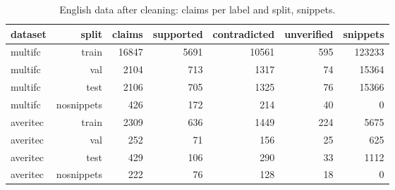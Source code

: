 \begin{table}[t]
\centering
\caption{English data after cleaning: claims per label and split, snippets.}
\label{tab:tab_data_counts}
\begin{tabular}{lrrrrrr}
\toprule
dataset & split & claims & supported & contradicted & unverified & snippets \\
\midrule
multifc & train & 16847 & 5691 & 10561 & 595 & 123233 \\
multifc & val & 2104 & 713 & 1317 & 74 & 15364 \\
multifc & test & 2106 & 705 & 1325 & 76 & 15366 \\
multifc & nosnippets & 426 & 172 & 214 & 40 & 0 \\
averitec & train & 2309 & 636 & 1449 & 224 & 5675 \\
averitec & val & 252 & 71 & 156 & 25 & 625 \\
averitec & test & 429 & 106 & 290 & 33 & 1112 \\
averitec & nosnippets & 222 & 76 & 128 & 18 & 0 \\
\bottomrule
\end{tabular}
\end{table}
